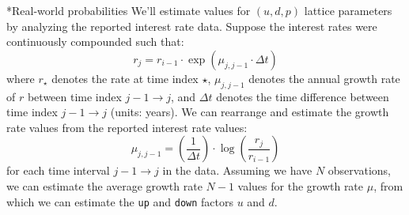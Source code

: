 \documentclass[11pt]{article}
\makeatletter
\theoremstyle{definition}
\renewcommand\subsubsection{\@startsection
	{subsubsection}{2}{0mm}
	{-0.05in}
	{-0.5\baselineskip}
	{\normalfont\normalsize\itshape\bfseries}}
\makeatother
\begin{document}
\subsubsection*{Real-world probabilities}
We'll estimate values for $(u,d,p)$ lattice parameters by analyzing the reported interest rate data. 
Suppose the interest rates were continuously compounded such that:
\begin{equation}
r_{j} = r_{i-1}\cdot\exp\left(\mu_{j,j-1}\cdot\Delta{t}\right)
\end{equation}
where $r_{\star}$ denotes the rate at time index $\star$, $\mu_{j,j-1}$ denotes the annual growth rate of $r$ between time index 
$j-1\rightarrow{j}$, and $\Delta{t}$ denotes the time difference between time index $j - 1\rightarrow{j}$ (units: years). 
We can rearrange and estimate the growth rate values from the reported interest rate values:
\begin{equation}
\mu_{j,j-1} = \left(\frac{1}{\Delta{t}}\right)\cdot\log\left(\frac{r_{j}}{r_{i-1}}\right)
\end{equation}
for each time interval $j - 1\rightarrow{j}$ in the data. Assuming we have $N$ observations, we can estimate the average growth rate $N-1$ values for the 
growth rate $\mu$, from which we can estimate the \texttt{up} and \texttt{down} factors $u$ and $d$.
\end{document}
